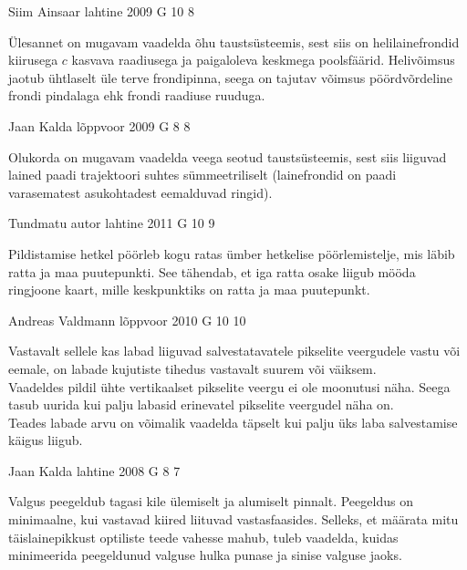 \documentclass[11pt]{article}
\begin{document}
{%
{Siim Ainsaar} %
{lahtine} %
{2009} %
{G 10} %
{8} %
{

\ifHint
Ülesannet on mugavam vaadelda õhu taustsüsteemis, sest siis on helilainefrondid kiirusega $c$ kasvava raadiusega ja paigaloleva keskmega poolsfäärid. Helivõimsus jaotub ühtlaselt üle terve frondipinna, seega on tajutav võimsus pöördvõrdeline frondi pindalaga ehk frondi raadiuse ruuduga.
\fi
}

{Jaan Kalda} %
{lõppvoor} %
{2009} %
{G 8} %
{8} %
{

\ifHint
Olukorda on mugavam vaadelda veega seotud taustsüsteemis, sest siis liiguvad lained paadi trajektoori suhtes sümmeetriliselt (lainefrondid on paadi varasematest asukohtadest eemalduvad ringid).
\fi
}

{Tundmatu autor} %
{lahtine} %
{2011} %
{G 10} %
{9} %
{

\ifHint
Pildistamise hetkel pöörleb kogu ratas ümber hetkelise pöörlemistelje, mis läbib
ratta ja maa puutepunkti. See tähendab, et iga ratta osake liigub mööda ringjoone kaart, mille keskpunktiks on ratta ja maa puutepunkt.
\fi
}

{Andreas Valdmann} %
{lõppvoor} %
{2010} %
{G 10} %
{10} %
{

\ifHint
\osa
Vastavalt sellele kas labad liiguvad salvestatavatele pikselite veergudele vastu või eemale, on labade kujutiste tihedus vastavalt suurem või väiksem.\\
\osa
Vaadeldes pildil ühte vertikaalset pikselite veergu ei ole moonutusi näha. Seega tasub uurida kui palju labasid erinevatel pikselite veergudel näha on.\\
\osa
Teades labade arvu on võimalik vaadelda täpselt kui palju üks laba salvestamise käigus liigub.
\fi
}

{Jaan Kalda} %
{lahtine} %
{2008} %
{G 8} %
{7} %
{

\ifHint
Valgus peegeldub tagasi kile ülemiselt ja alumiselt pinnalt. Peegeldus on minimaalne, kui vastavad kiired liituvad vastasfaasides. Selleks, et määrata mitu täislainepikkust optiliste teede vahesse mahub, tuleb vaadelda, kuidas minimeerida peegeldunud valguse hulka punase ja sinise valguse jaoks. 
\fi
}

}
\end{document}
